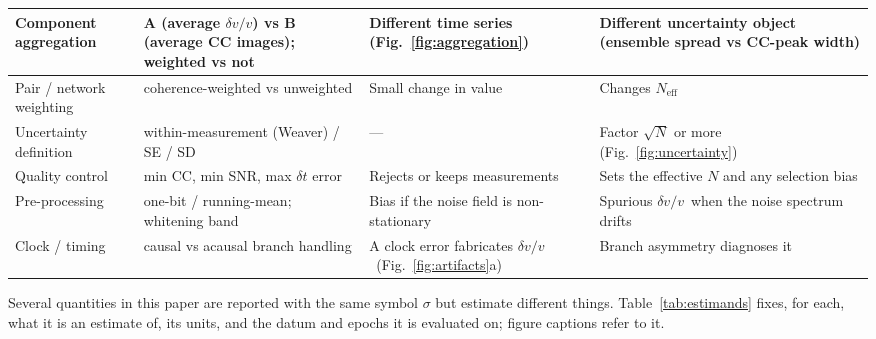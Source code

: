 \documentclass[
  referee]{gji}
\providecommand{\dvv}{\ensuremath{\delta v/v}}
\begin{document}
\begin{table}
\begin{tabularx}{\textwidth}{@{}>{\raggedright\arraybackslash}p{2.35cm} L L L@{}}
Component aggregation & A (average \dvv) vs B (average CC images); weighted vs
not & Different time series (Fig.~\ref{fig:aggregation}) & Different uncertainty
object (ensemble spread vs CC-peak width) \\ \hline
Pair / network weighting & coherence-weighted vs unweighted & Small change in
value & Changes $N_{\mathrm{eff}}$ \\ \hline
Uncertainty definition & within-measurement (Weaver) / SE / SD &
--- & Factor $\sqrt{N}$ or more (Fig.~\ref{fig:uncertainty}) \\ \hline
Quality control & min CC, min SNR, max $\delta t$ error & Rejects or keeps
measurements & Sets the effective $N$ and any selection bias \\ \hline
Pre-processing & one-bit / running-mean; whitening band & Bias if the noise
field is non-stationary & Spurious \dvv\ when the noise spectrum drifts
\citep{Zhan2013} \\ \hline
Clock / timing & causal vs acausal branch handling & A clock error fabricates
\dvv\ (Fig.~\ref{fig:artifacts}a) & Branch asymmetry diagnoses it \\
\bottomrule
\end{tabularx}
\end{table}

Several quantities in this paper are reported with the same symbol
\(\sigma\) but estimate different things. Table~\ref{tab:estimands}
fixes, for each, what it is an estimate of, its units, and the datum and
epochs it is evaluated on; figure captions refer to it.
\end{document}
